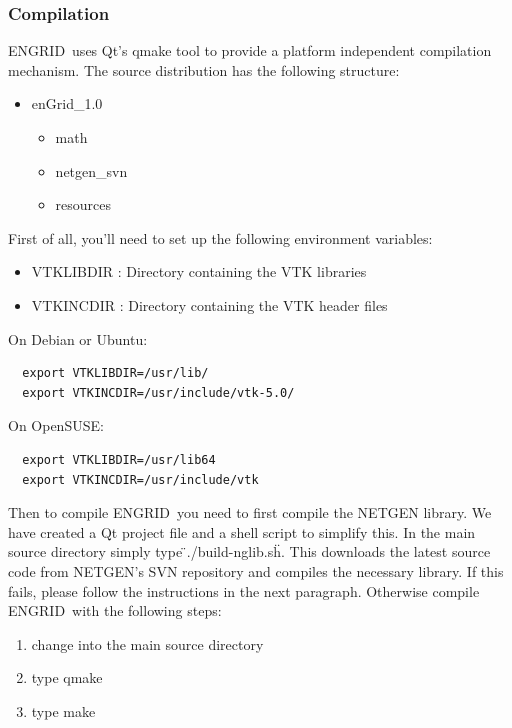 \documentclass[10pt,a4paper,british]{book}
\newcommand\eg{ENGRID\ }
\newcommand\egv{1.0}
\begin{document}
\subsubsection{Compilation}
\eg uses Qt's qmake tool to provide a platform independent compilation
mechanism. The source distribution has the following structure:
\begin{itemize}
\item enGrid\_\egv
\begin{itemize}
\item math
\item netgen\_svn
\item resources
\end{itemize}
\end{itemize}
First of all, you'll need to set up the following environment variables:
\begin{itemize}
\item VTKLIBDIR : Directory containing the VTK libraries
\item VTKINCDIR : Directory containing the VTK header files
\end{itemize}

On Debian or Ubuntu:
\begin{verbatim}
  export VTKLIBDIR=/usr/lib/
  export VTKINCDIR=/usr/include/vtk-5.0/
\end{verbatim}

On OpenSUSE:
\begin{verbatim}
  export VTKLIBDIR=/usr/lib64
  export VTKINCDIR=/usr/include/vtk
\end{verbatim}

Then to compile \eg you need to first compile the NETGEN library. We have created a Qt project file and a shell script to simplify this. In the main source directory simply type \"{}./build-nglib.sh\"{}. This downloads the latest source code from NETGEN's SVN repository and compiles the necessary library. If this fails, please follow the instructions in the next paragraph.
Otherwise compile \eg with the following steps:
\begin{enumerate}
\item change into the main source directory
\item type qmake
\item type make
\end{enumerate}
\end{document}
